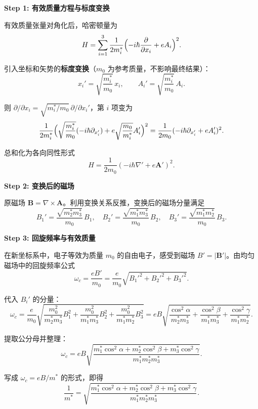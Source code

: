 \begin{derivationbox}[标准解题过程]
\textbf{Step 1: 有效质量方程与标度变换}

有效质量张量对角化后，哈密顿量为
\begin{equation}
H=\sum_{i=1}^3\frac{1}{2m_i^*}\Bigl(-i\hbar\frac{\partial}{\partial x_i}+eA_i\Bigr)^2.
\end{equation}

引入坐标和矢势的\textbf{标度变换}（$m_0$ 为参考质量，不影响最终结果）：
\begin{equation}
x_i'=\sqrt{\frac{m_i^*}{m_0}}\,x_i,\qquad A_i'=\sqrt{\frac{m_i^*}{m_0}}\,A_i.
\end{equation}

则 $\partial/\partial x_i=\sqrt{m_i^*/m_0}\,\partial/\partial x_i'$，第 $i$ 项变为
\begin{equation}
\frac{1}{2m_i^*}\Bigl(\sqrt{\frac{m_i^*}{m_0}}(-i\hbar\partial_{x_i'})+e\sqrt{\frac{m_0}{m_i^*}}A_i'\Bigr)^2
=\frac{1}{2m_0}(-i\hbar\partial_{x_i'}+eA_i')^2.
\end{equation}

总和化为各向同性形式
\begin{equation}
H=\frac{1}{2m_0}(-i\hbar\nabla'+e\bm{A}')^2.
\end{equation}

\textbf{Step 2: 变换后的磁场}

原磁场 $\bm{B}=\nabla\times\bm{A}$。利用变换关系反推，变换后的磁场分量满足
\begin{equation}
B_1'=\frac{\sqrt{m_2^*m_3^*}}{m_0}\,B_1,\quad
B_2'=\frac{\sqrt{m_1^*m_3^*}}{m_0}\,B_2,\quad
B_3'=\frac{\sqrt{m_1^*m_2^*}}{m_0}\,B_3.
\end{equation}

\textbf{Step 3: 回旋频率与有效质量}

在新坐标系中，电子等效为质量 $m_0$ 的自由电子，感受到磁场 $B'=|\bm{B}'|$。由均匀磁场中的回旋频率公式
\begin{equation}
\omega_c=\frac{eB'}{m_0}=\frac{e}{m_0}\sqrt{B_1'^2+B_2'^2+B_3'^2}.
\end{equation}

代入 $B_i'$ 的分量：
\begin{equation}
\omega_c=\frac{e}{m_0}\sqrt{\frac{m_0^2}{m_2^*m_3^*}B_1^2+\frac{m_0^2}{m_1^*m_3^*}B_2^2+\frac{m_0^2}{m_1^*m_2^*}B_3^2}
=eB\sqrt{\frac{\cos^2\alpha}{m_2^*m_3^*}+\frac{\cos^2\beta}{m_1^*m_3^*}+\frac{\cos^2\gamma}{m_1^*m_2^*}}.
\end{equation}

提取公分母并整理：
\begin{equation}
\omega_c=eB\sqrt{\frac{m_1^*\cos^2\alpha+m_2^*\cos^2\beta+m_3^*\cos^2\gamma}{m_1^*m_2^*m_3^*}}.
\end{equation}

写成 $\omega_c=eB/m^*$ 的形式，即得
\begin{equation}
\boxed{\frac{1}{m^*}=\sqrt{\frac{m_1^*\cos^2\alpha+m_2^*\cos^2\beta+m_3^*\cos^2\gamma}{m_1^*m_2^*m_3^*}}.}
\end{equation}
\end{derivationbox}

